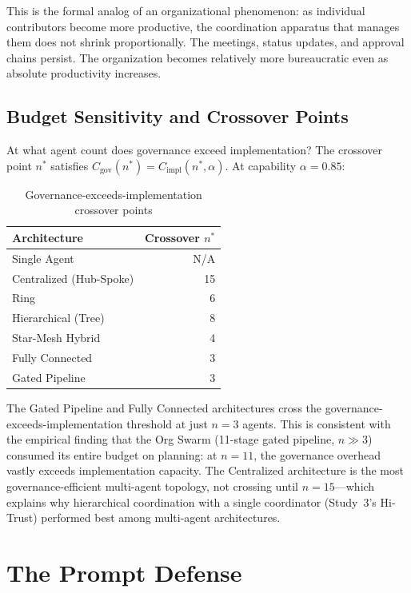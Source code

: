 \documentclass[11pt,a4paper]{article}
\begin{document}
This is the formal analog of an organizational phenomenon: as individual contributors become more productive, the coordination apparatus that manages them does not shrink proportionally. The meetings, status updates, and approval chains persist. The organization becomes relatively more bureaucratic even as absolute productivity increases.

\subsection{Budget Sensitivity and Crossover Points}
\label{sec:budget-sensitivity}

At what agent count does governance exceed implementation? The crossover point $n^*$ satisfies $C_{\text{gov}}(n^*) = C_{\text{impl}}(n^*, \alpha)$. At capability $\alpha = 0.85$:

\begin{table}[H]
\centering
\caption{Governance-exceeds-implementation crossover points}
\label{tab:crossover}
\begin{tabular}{@{}lr@{}}
\toprule
\textbf{Architecture} & \textbf{Crossover $n^*$} \\
\midrule
Single Agent & N/A \\
Centralized (Hub-Spoke) & 15 \\
Ring & 6 \\
Hierarchical (Tree) & 8 \\
Star-Mesh Hybrid & 4 \\
Fully Connected & 3 \\
Gated Pipeline & 3 \\
\bottomrule
\end{tabular}
\end{table}

The Gated Pipeline and Fully Connected architectures cross the governance-exceeds-implementation threshold at just $n = 3$ agents. This is consistent with the empirical finding that the Org Swarm (11-stage gated pipeline, $n \gg 3$) consumed its entire budget on planning: at $n = 11$, the governance overhead vastly exceeds implementation capacity. The Centralized architecture is the most governance-efficient multi-agent topology, not crossing until $n = 15$---which explains why hierarchical coordination with a single coordinator (Study~3's Hi-Trust) performed best among multi-agent architectures.


\section{The Prompt Defense}
\label{sec:defense}
\end{document}
